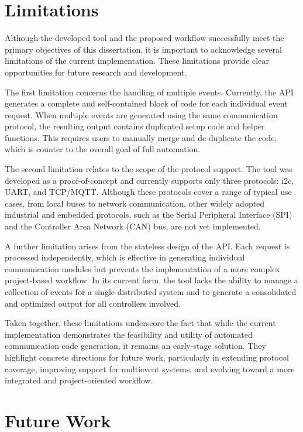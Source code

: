 \section{Limitations}
\label{sec:limitations}

Although the developed tool and the proposed workflow successfully meet the primary objectives of this dissertation, it is important to acknowledge several limitations of the current implementation. These limitations provide clear opportunities for future research and development. 

The first limitation concerns the handling of multiple events. Currently, the API generates a complete and self-contained block of code for each individual event request. When multiple events are generated using the same communication protocol, the resulting output contains duplicated setup code and helper functions. This requires users to manually merge and de-duplicate the code, which is counter to the overall goal of full automation.

The second limitation relates to the scope of the protocol support. The tool was developed as a proof-of-concept and currently supports only three protocols: \gls{i2c}, UART, and TCP/MQTT. Although these protocols cover a range of typical use cases, from local buses to network communication, other widely adopted industrial and embedded protocols, such as the Serial Peripheral Interface (SPI) and the Controller Area Network (CAN) bus, are not yet implemented.

A further limitation arises from the stateless design of the API. Each request is processed independently, which is effective in generating individual communication modules but prevents the implementation of a more complex project-based workflow. In its current form, the tool lacks the ability to manage a collection of events for a single distributed system and to generate a consolidated and optimized output for all controllers involved.

Taken together, these limitations underscore the fact that while the current implementation demonstrates the feasibility and utility of automated communication code generation, it remains an early-stage solution. They highlight concrete directions for future work, particularly in extending protocol coverage, improving support for multievent systems, and evolving toward a more integrated and project-oriented workflow.



\section{Future Work}
\label{sec:future_work}

